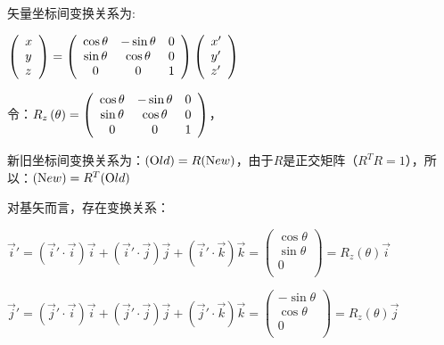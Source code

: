 矢量坐标间变换关系为:


$\left( \begin{array}{l}
 x \\
 y \\
 z \\
 \end{array} \right) = \left( {\begin{array}{*{20}c}
   {\cos \theta } & { - \sin \theta } & 0  \\
   {\sin \theta } & {\cos \theta } & 0  \\
   0 & 0 & 1  \\
\end{array}} \right)\left( \begin{array}{l}
 {x'} \\
 {y'} \\
 {z'} \\
 \end{array} \right)$

令：$R_z \left( \theta  \right) = \left( {\begin{array}{*{20}c}
   {\cos \theta } & { - \sin \theta } & 0  \\
   {\sin \theta } & {\cos \theta } & 0  \\
   0 & 0 & 1  \\
\end{array}} \right)$，

新旧坐标间变换关系为：$( \text Old ) = R ( \text New
)$，由于$R$是正交矩阵（$R^T R =1$），所以：$( \text New ) = R^T (
\text Old )$

对基矢而言，存在变换关系：



$\vec i' = ( \vec i' \cdot \vec i ) \vec i + ( \vec i' \cdot \vec j
) \vec j + ( \vec i' \cdot \vec k ) \vec k = \left( \begin{array}{l}
 \cos \theta  \\
 \sin \theta  \\
 0 \\
 \end{array} \right) = R_z (\theta) \vec i$


$\vec j' = ( \vec j' \cdot \vec i ) \vec i + ( \vec j' \cdot \vec j
) \vec j + ( \vec j' \cdot \vec k ) \vec k = \left( \begin{array}{l}
  - \sin \theta  \\
 \cos \theta  \\
 0 \\
 \end{array} \right) = R_z (\theta) \vec j$


